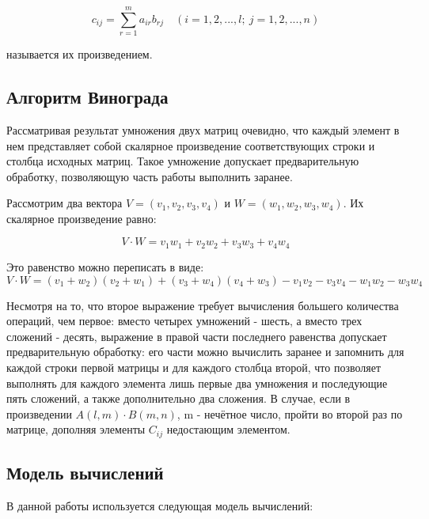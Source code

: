 \begin{equation}
    \label{eq:1.1}
    c_{ij} =
    \sum_{r=1}^{m} a_{ir} b_{rj} \quad (i=1,2,...,l; \ j=1,2,...,n)
\end{equation}

называется их произведением.


\subsection{Алгоритм Винограда}

Рассматривая результат умножения двух матриц очевидно, что каждый элемент
в нем представляет собой скалярное произведение соответствующих строки и столбца исходных матриц.
Такое умножение допускает предварительную обработку,
позволяющую часть работы выполнить заранее.

Рассмотрим два вектора
$V = (v_1, v_2, v_3, v_4)$ и
$W = (w_1, w_2, w_3, w_4)$.
Их скалярное произведение равно:

\begin{equation}
    \label{eq:1.2}
    V \cdot W = v_1 w_1 + v_2 w_2 + v_3 w_3 + v_4 w_4
\end{equation}


Это равенство можно переписать в виде:
\begin{equation}
    \label{eq:1.2}
    V \cdot W = (v_1+w_2)(v_2+w_1)+(v_3+w_4)(v_4+w_3)-v_1v_2-v_3v_4-w_1w_2-w_3w_4
\end{equation}

Несмотря на то, что второе выражение требует вычисления большего
количества операций, чем первое: вместо четырех умножений - шесть,
а вместо трех сложений - десять, выражение в правой части последнего равенства
допускает предварительную обработку: его части можно вычислить заранее
и запомнить для каждой строки первой матрицы и для каждого столбца
второй, что позволяет выполнять для каждого элемента лишь первые два
умножения и последующие пять сложений, а также дополнительно два сложения.
В случае, если в произведении $A(l,m) \cdot B(m,n)$, m - нечётное число,
пройти во второй раз по матрице, дополняя элементы $C_{ij}$ недостающим элементом.



\subsection{Модель вычислений}

В данной работы используется следующая модель вычислений:

